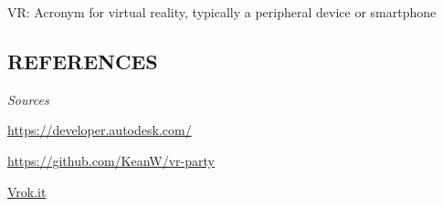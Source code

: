 \documentclass[letterpaper, 10pt, draftclsnofoot, onecolumn]{IEEEtran}
\makeatletter
\newcommand\arraybslash{\let\\\@arraycr}
\makeatother
\begin{document}
{\color{black}
	VR: Acronym for virtual reality, typically a peripheral device or smartphone
}
\begin{comment}

\bigskip

\begin{flushleft}
\tablehead{}
\begin{supertabular}{|m{1.3587599in}|m{5.00806in}|}
\hline
\centering \selectlanguage{english}\bfseries\color{black} Term or
Acronym &
\centering\arraybslash \selectlanguage{english}\bfseries\color{black}
Definition\\\hline
\selectlanguage{english}\color{black} Alpha test &
\selectlanguage{english}\color{black} Limited release(s) to selected,
outside testers\\\hline
\selectlanguage{english}\color{black} Beta test &
\selectlanguage{english}\color{black} Limited release(s) to cooperating
customers wanting early access to developing systems\\\hline
\selectlanguage{english}\color{black} Final test &
\selectlanguage{english}\color{black} aka, Acceptance test, release of
full functionality to customer for approval\\\hline
\selectlanguage{english}\color{black} DFD &
\selectlanguage{english}\color{black} Data Flow Diagram\\\hline
\selectlanguage{english}\color{black} SDD &
\selectlanguage{english}\color{black} Software Design Document, aka SDS,
Software Design Specification\\\hline
\selectlanguage{english}\color{black} SRS &
\selectlanguage{english}\color{black} Software Requirements
Specification\\\hline
\selectlanguage{english}\color{black} SSRS &
\selectlanguage{english}\color{black} System and Software Requirements
Specification\\\hline
~
 &
~
\\\hline
~
 &
~
\\\hline
~
 &
~
\\\hline
\end{supertabular}
\end{flushleft}
\end{comment}



\subsection[REFERENCES]{\rmfamily\bfseries\color{black}
REFERENCES}
{\itshape\color{black}
Sources}
{\color{black}

\url{https://developer.autodesk.com/}

\url{https://github.com/KeanW/vr-party}

\url{Vrok.it}
}
\end{document}
